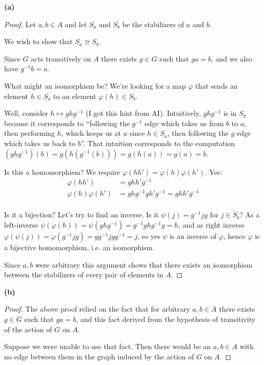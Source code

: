 {\bf (a)}\\
\begin{proof}
  Let $a, b \in A$ and let $S_a$ and $S_b$ be the stabilizers of $a$ and $b$.

  We wish to show that $S_a \cong S_b$.

  Since $G$ acts transitively on $A$ there exists $g \in G$ such that $ga = b$, and we also
  have $g^{-1}b = a$.

  What might an isomorphism be? We're looking for a map $\varphi$ that sends an element $h \in S_a$ to an
  element $\varphi(h) \in S_b$.

  Well, consider $h \mapsto ghg^{-1}$ (I got this hint from AI). Intuitively, $ghg^{-1}$ is in
  $S_b$ because it corresponds to ``following the $g^{-1}$ edge which takes us from $b$ to $a$, then
  performing $h$, which keeps us at $a$ since $h \in S_a$, then following the $g$ edge which takes us
  back to $b$​''. That intuition corresponds to the
  computation $(ghg^{-1})(b) = g(h(g^{-1}(b))) = g(h(a)) = g(a) = b$.

  Is this a homomorphism? We require $\varphi(hh') = \varphi(h)\varphi(h')$. Yes:
  \begin{align*}
    \varphi(hh')    &= ghh'g^{-1} \\
    \varphi(h)\varphi(h') &= ghg^{-1}gh'g^{-1} = ghh'g^{-1}\\
  \end{align*}

  Is it a bijection? Let's try to find an inverse. Is it $\psi(j) = g^{-1}jg$ for $j \in S_b$? As a
  left-inverse $\psi(\varphi(h)) = \psi(ghg^{-1}) = g^{-1}ghg^{-1}g = h$, and as right
  inverse $\varphi(\psi(j)) = \varphi(g^{-1}jg) = gg^{-1}jgg^{-1} = j$, so yes $\psi$ is an inverse of
  $\varphi$, hence $\varphi$ is a bijective homomorphism, i.e. an isomorphism.

  Since $a, b$ were arbitrary this argument shows that there exists an isomorphism between the
  stabilizers of every pair of elements in $A$.
\end{proof}


{\bf (b)}\\

\begin{proof}
  The above proof relied on the fact that for arbitrary $a, b \in A$ there exists $g \in G$ such
  that $ga = b$, and this fact derived from the hypothesis of transitivity of the action of $G$
  on $A$.

  Suppose we were unable to use that fact. Then there would be an $a, b \in A$ with no edge between
  them in the graph induced by the action of $G$ on $A$.
\end{proof}
